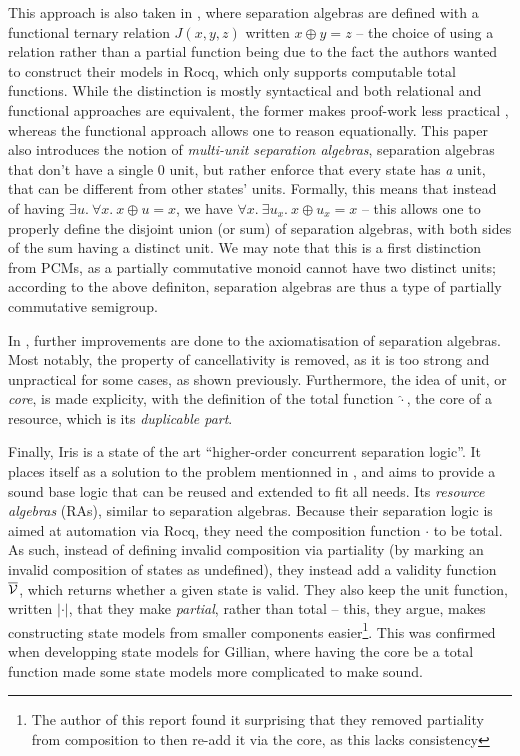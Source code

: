 This approach is also taken in \cite{sepalgebra}, where separation algebras are defined with a functional ternary relation $J(x,y,z)$ written $x\oplus y=z$ -- the choice of using a relation rather than a partial function being due to the fact the authors wanted to construct their models in Rocq, which only supports computable total functions. While the distinction is mostly syntactical and both relational and functional approaches are equivalent, the former makes proof-work less practical \cite{statesoundness, iris}, whereas the functional approach allows one to reason equationally. This paper also introduces the notion of \emph{multi-unit separation algebras}, separation algebras that don't have a single $0$ unit, but rather enforce that every state has \emph{a} unit, that can be different from other states' units. Formally, this means that instead of having $\exists u.~\forall x.~x \oplus u = x$, we have $\forall x.~\exists u_x.~ x\oplus u_x=x$ -- this allows one to properly define the disjoint union (or sum) of separation algebras, with both sides of the sum having a distinct unit. We may note that this is a first distinction from PCMs, as a partially commutative monoid cannot have two distinct units; according to the above definiton, separation algebras are thus a type of partially commutative semigroup.

In \cite{statesoundness}, further improvements are done to the axiomatisation of separation algebras. Most notably, the property of cancellativity is removed, as it is too strong and unpractical for some cases, as shown previously. Furthermore, the idea of unit, or \emph{core}, is made explicity, with the definition of the total function $\hat\cdot$, the core of a resource, which is its \emph{duplicable part}.

Finally, Iris \cite{iris} is a state of the art ``higher-order concurrent separation logic''. It places itself as a solution to the problem mentionned in \cite{next700seplogics}, and aims to provide a sound base logic that can be reused and extended to fit all needs. Its \emph{resource algebras} (RAs), similar to separation algebras. Because their separation logic is aimed at automation via Rocq, they need the composition function $\cdot$ to be total. As such, instead of defining invalid composition via partiality (by marking an invalid composition of states as undefined), they instead add a validity function $\cal\overline V$, which returns whether a given state is valid. They also keep the unit function, written $|\cdot|$, that they make \emph{partial}, rather than total -- this, they argue, makes constructing state models from smaller components easier\footnote{The author of this report found it surprising that they removed partiality from composition to then re-add it via the core, as this lacks consistency}. This was confirmed when developping state models for Gillian, where having the core be a total function made some state models more complicated to make sound.

